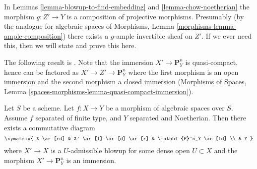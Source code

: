 \begin{remark}
\label{remark-chow-Noetherian}
In Lemmas \ref{lemma-blowup-to-find-embedding} and \ref{lemma-chow-noetherian}
the morphism $g : Z' \to Y$ is a composition of projective morphisms.
Presumably (by the analogue for algebraic spaces of
Morphisms, Lemma \ref{morphisms-lemma-ample-composition})
there exists a $g$-ample invertible sheaf on $Z'$.
If we ever need this, then we will state and prove this here.
\end{remark}

\noindent
The following result is \cite[IV Theorem 3.1]{Kn}. Note that the immersion
$X' \to \mathbf{P}^n_Y$ is quasi-compact, hence can be factored as
$X' \to Z' \to \mathbf{P}^n_Y$ where the first morphism is an
open immersion and the second morphism a closed immersion
(Morphisms of Spaces, Lemma
\ref{spaces-morphisms-lemma-quasi-compact-immersion}).

\begin{lemma}
\label{lemma-chow-noetherian-separated}
\begin{reference}
\cite[IV Theorem 3.1]{Kn}
\end{reference}
Let $S$ be a scheme. Let $f : X \to Y$ be a morphism of algebraic spaces
over $S$. Assume $f$ separated of finite type, and $Y$ separated and
Noetherian. Then there exists a commutative diagram
$$
\xymatrix{
X \ar[rd] & X' \ar[l] \ar[d] \ar[r] & \mathbf{P}^n_Y \ar[ld] \\
& Y
}
$$
where $X' \to X$ is a $U$-admissible blowup for some dense open
$U \subset X$ and the morphism $X' \to \mathbf{P}^n_Y$ is an immersion.
\end{lemma}

